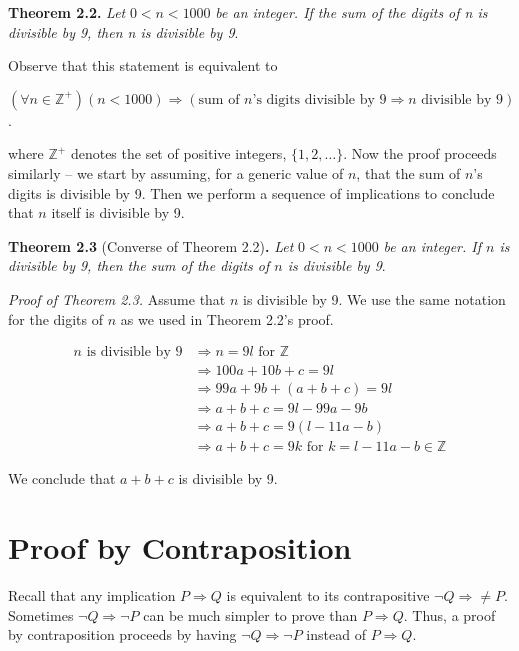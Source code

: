 \documentclass[12pt,a4paper]{article}
\begin{document}
\bigbreak

\textbf{Theorem 2.2.} \textit{Let} $0<n<1000$ \textit{be an integer. If the sum of the digits of n is divisible by 9, then n is divisible by 9}.

\bigbreak

Observe that this statement is equivalent to 
\begin{center}
	$(\forall n\in\mathbb{Z}^{+})(n<1000)\Rightarrow(\text{sum of }n\text{'s digits divisible by }9\Rightarrow n \text{ divisible by 9})$.
\end{center}
where $\mathbb{Z}^{+}$ denotes the set of positive integers, $\{1,2,\dots\}$. Now the proof proceeds similarly -- we start by assuming, for a generic value of $n$, that the sum of $n$'s digits is divisible by 9. Then we perform a sequence of implications to conclude that $n$ itself is divisible by 9.

\bigbreak

\textbf{Theorem 2.3} (Converse of Theorem 2.2)\textbf{.} \textit{Let} $0<n<1000$ \textit{be an integer. If $n$ is divisible by 9, then the sum of the digits of $n$ is divisible by 9}.

\bigbreak

\textit{Proof of Theorem 2.3.} Assume that $n$ is divisible by 9. We use the same notation for the digits of $n$ as we used in Theorem 2.2's proof.
\begin{center}
	\begin{align*}
		n \text{ is divisible by 9}&\Rightarrow n=9l \text{ for } \mathbb{Z} \\
		&\Rightarrow 100a+10b+c=9l \\
		&\Rightarrow 99a+9b+(a+b+c)=9l \\
		&\Rightarrow a+b+c=9l-99a-9b \\
		&\Rightarrow a+b+c=9(l-11a-b) \\
		&\Rightarrow a+b+c=9k \text{ for } k=l-11a-b\in\mathbb{Z}
	\end{align*}
\end{center}
We conclude that $a+b+c$ is divisible by 9.

\newpage

\section*{Proof by Contraposition}

Recall that any implication $P\Rightarrow Q$ is equivalent to its contrapositive $\neg Q\Rightarrow\neq P$. Sometimes $\neg Q\Rightarrow \neg P$ can be much simpler to prove than $P\Rightarrow Q$. Thus, a proof by contraposition proceeds by having $\neg Q\Rightarrow \neg P$ instead of $P \Rightarrow Q$.
\end{document}
